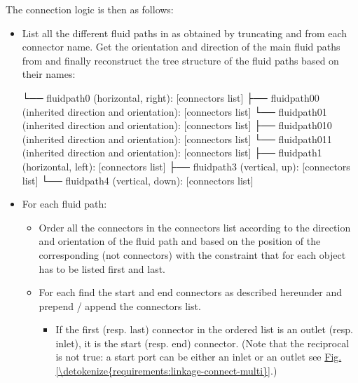 \documentclass[letterpaper,10pt, openany,english]{sphinxmanual}
\begin{document}
The connection logic is then as follows:
\begin{itemize}
\item {} 
List all the different fluid paths in  as obtained by truncating  and  from each connector name. Get the orientation and direction of the main fluid paths from  and finally reconstruct the tree structure of the fluid paths based on their names:

\begin{sphinxVerbatim}[commandchars=\\\{\}]
└── fluid\PYGZus{}path0 (horizontal, right): [connectors list]
  ├── fluid\PYGZus{}path0\PYGZus{}0 (inherited direction and orientation): [connectors list]
  └── fluid\PYGZus{}path0\PYGZus{}1 (inherited direction and orientation): [connectors list]
    ├── fluid\PYGZus{}path0\PYGZus{}1\PYGZus{}0 (inherited direction and orientation): [connectors list]
    └── fluid\PYGZus{}path0\PYGZus{}1\PYGZus{}1 (inherited direction and orientation): [connectors list]
├── fluid\PYGZus{}path1 (horizontal, left): [connectors list]
├── fluid\PYGZus{}path3 (vertical, up): [connectors list]
└── fluid\PYGZus{}path4 (vertical, down): [connectors list]
\end{sphinxVerbatim}

\item {} 
For each fluid path:
\begin{itemize}
\item {} 
Order all the connectors in the connectors list according to the direction and orientation of the fluid path and based on the position of the corresponding  (not connectors) with the constraint that for each object  has to be listed first and  last.

\item {} 
For each  find the start and end connectors as described hereunder and prepend / append the connectors list.
\begin{itemize}
\item {} 
If the first (resp. last) connector in the ordered list is an outlet (resp. inlet), it is the start (resp. end) connector. (Note that the reciprocal is not true: a start port can be either an inlet or an outlet see \hyperref[\detokenize{requirements:linkage-connect-multi}]{Fig.\@ \ref{\detokenize{requirements:linkage-connect-multi}}}.)


\end{itemize}
\end{itemize}
\end{itemize}
\end{document}
